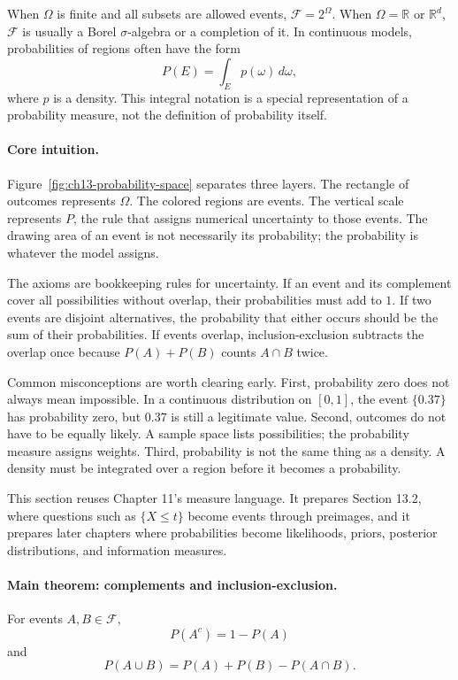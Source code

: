 When \(\Omega\) is finite and all subsets are allowed events, \(\mathcal{F}=2^\Omega\). When \(\Omega=\mathbb{R}\) or \(\mathbb{R}^d\), \(\mathcal{F}\) is usually a Borel \(\sigma\)-algebra or a completion of it. In continuous models, probabilities of regions often have the form
\[
P(E)=\int_E p(\omega)\,d\omega,
\]
where \(p\) is a density. This integral notation is a special representation of a probability measure, not the definition of probability itself.

\paragraph{Core intuition.}
Figure~\ref{fig:ch13-probability-space} separates three layers. The rectangle of outcomes represents \(\Omega\). The colored regions are events. The vertical scale represents \(P\), the rule that assigns numerical uncertainty to those events. The drawing area of an event is not necessarily its probability; the probability is whatever the model assigns.

The axioms are bookkeeping rules for uncertainty. If an event and its complement cover all possibilities without overlap, their probabilities must add to \(1\). If two events are disjoint alternatives, the probability that either occurs should be the sum of their probabilities. If events overlap, inclusion-exclusion subtracts the overlap once because \(P(A)+P(B)\) counts \(A\cap B\) twice.

Common misconceptions are worth clearing early. First, probability zero does not always mean impossible. In a continuous distribution on \([0,1]\), the event \(\{0.37\}\) has probability zero, but \(0.37\) is still a legitimate value. Second, outcomes do not have to be equally likely. A sample space lists possibilities; the probability measure assigns weights. Third, probability is not the same thing as a density. A density must be integrated over a region before it becomes a probability.

This section reuses Chapter 11's measure language. It prepares Section 13.2, where questions such as \(\{X\leq t\}\) become events through preimages, and it prepares later chapters where probabilities become likelihoods, priors, posterior distributions, and information measures.

\paragraph{Main theorem: complements and inclusion-exclusion.}
For events \(A,B\in\mathcal{F}\),
\[
P(A^c)=1-P(A)
\]
and
\[
P(A\cup B)=P(A)+P(B)-P(A\cap B).
\]

